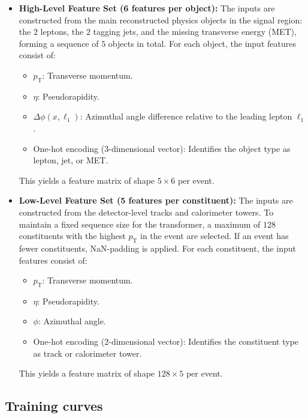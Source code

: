 \documentclass[12pt]{article}
\begin{document}
        \begin{itemize}
            \item \textbf{High-Level Feature Set (6 features per object):} The inputs are constructed from the main reconstructed physics objects in the signal region: the $2$ leptons, the $2$ tagging jets, and the missing transverse energy (MET), forming a sequence of $5$ objects in total. For each object, the input features consist of:
                \begin{itemize}
                    \item $p_{\text{T}}$: Transverse momentum.
                    \item $\eta$: Pseudorapidity.
                    \item $\Delta\phi(x, \ell_1)$: Azimuthal angle difference relative to the leading lepton $\ell_1$.
                    \item One-hot encoding ($3$-dimensional vector): Identifies the object type as lepton, jet, or MET.
                \end{itemize}
                This yields a feature matrix of shape $5 \times 6$ per event.

            \item \textbf{Low-Level Feature Set (5 features per constituent):} The inputs are constructed from the detector-level tracks and calorimeter towers. To maintain a fixed sequence size for the transformer, a maximum of $128$ constituents with the highest $p_{\text{T}}$ in the event are selected. If an event has fewer constituents, NaN-padding is applied. For each constituent, the input features consist of:
                \begin{itemize}
                    \item $p_{\text{T}}$: Transverse momentum.
                    \item $\eta$: Pseudorapidity.
                    \item $\phi$: Azimuthal angle.
                    \item One-hot encoding ($2$-dimensional vector): Identifies the constituent type as track or calorimeter tower.
                \end{itemize}
                This yields a feature matrix of shape $128 \times 5$ per event.
        \end{itemize}


    \subsection{Training curves}%
    \label{sub:part_training_curves}
\end{document}
